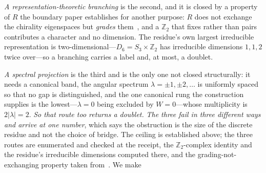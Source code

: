 \documentclass[11pt]{article}
\begin{document}
\emph{A representation-theoretic branching} is the second, and it is closed by a property of $R$ the
boundary paper establishes for another purpose: $R$ does not exchange the chirality eigenspaces but
\emph{grades} them~\cite{JanzenBoundary}, and a $\mathbb{Z}_2$ that fixes rather than pairs contributes
a character and no dimension. The residue's own largest irreducible representation is
two-dimensional---$D_6=S_3\times\mathbb{Z}_2$ has irreducible dimensions $1,1,2$ twice over---so a
branching carries a label and, at most, a doublet. 

\emph{A spectral projection} is the third and is the
only one not closed structurally: it needs a canonical band, the angular spectrum
$\lambda=\pm1,\pm2,\dots$ is uniformly spaced so that no gap is distinguished, and the one canonical
rung the construction supplies is the lowest---$\lambda=0$ being excluded by $W=0$---whose multiplicity
is $2\lvert\lambda\rvert=2$. \emph{So that route too returns a doublet.} \emph{The three fail in three
different ways and arrive at one number}, which says the obstruction is the size of the discrete
residue and not the choice of bridge. The ceiling is established above; the three routes are
enumerated and checked at the receipt, the $\mathbb{Z}_2$-complex identity and the residue's irreducible
dimensions computed there, and the grading-not-exchanging property taken from~\cite{JanzenBoundary}. We make
\end{document}
